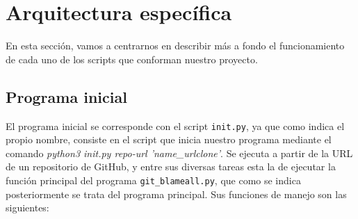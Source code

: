 \documentclass[a4paper, 12pt]{book}
\begin{document}
\section{Arquitectura específica} 
\label{sec:arquitectura-especifica}

En esta sección, vamos a centrarnos en describir más a fondo el funcionamiento de cada uno de los scripts que conforman nuestro proyecto.

\subsection{Programa inicial}
\label{subsec:programa-inicial}

El programa inicial se corresponde con el script \texttt{init.py}, ya que como indica el propio nombre, consiste en el script que inicia nuestro programa mediante el comando \textit{python3 init.py repo-url 'name\_urlclone'}.
Se ejecuta a partir de la URL de un repositorio de GitHub, y entre sus diversas tareas esta la de ejecutar la función principal del programa \texttt{git\_blameall.py}, que como se indica posteriormente se trata del
programa principal. Sus funciones de manejo son las siguientes:
\end{document}
